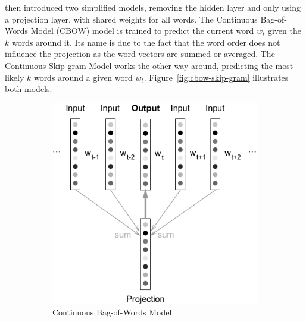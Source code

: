 \cite{Mikolov:2013ad} then introduced two simplified models, removing the hidden layer and only using a projection layer, with shared weights for all words. The Continuous Bag-of-Words Model (CBOW) model is trained to predict the current word $w_t$ given the $k$ words around it. Its name is due to the fact that the word order does not influence the projection as the word vectors are summed or averaged. The Continuous Skip-gram Model works the other way around, predicting the most likely $k$ words around a given word $w_t$. Figure~\ref{fig:cbow-skip-gram} illustrates both models.


\begin{figure}[h]
    \centering
    \begin{subfigure}[b]{0.49\textwidth}
        \includegraphics[width=\textwidth]{img/cbow_vert2.pdf}
        \caption{Continuous Bag-of-Words Model}
\label{fig:cbow}
    \end{subfigure}
    \begin{subfigure}[b]{0.49\textwidth}

\end{subfigure}
\end{figure}
